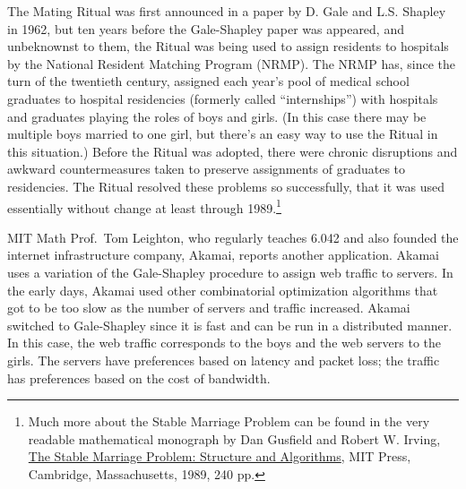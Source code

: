 The Mating Ritual was first announced in a paper by D. Gale and
L.S. Shapley in 1962, but ten years before the Gale-Shapley paper was
appeared, and unbeknownst to them, the Ritual was being used to assign
residents to hospitals by the National Resident Matching Program (NRMP).
The NRMP has, since the turn of the twentieth century, assigned each
year's pool of medical school graduates to hospital residencies (formerly
called ``internships'') with hospitals and graduates playing the roles of
boys and girls.  (In this case there may be multiple boys married to one
girl, but there's an easy way to use the Ritual in this situation.)
Before the Ritual was adopted, there were chronic disruptions and awkward
countermeasures taken to preserve assignments of graduates to residencies.
The Ritual resolved these problems so successfully, that it was used
essentially without change at least through 1989.\footnote{Much more about
the Stable Marriage Problem can be found in the very readable mathematical
monograph by Dan Gusfield and Robert W. Irving,
\href{http://mitpress.mit.edu/catalog/item/default.asp?ttype=2&tid=7676}{The
Stable Marriage Problem: Structure and Algorithms}, MIT Press, Cambridge,
Massachusetts, 1989, 240 pp.}

MIT Math Prof.\ Tom Leighton, who regularly teaches 6.042 and also founded
the internet infrastructure company, Akamai, reports another application.
Akamai uses a variation of the Gale-Shapley procedure to assign web
traffic to servers.  In the early days, Akamai used other combinatorial
optimization algorithms that got to be too slow as the number of servers
and traffic increased.  Akamai switched to Gale-Shapley since it is fast
and can be run in a distributed manner.  In this case, the web traffic
corresponds to the boys and the web servers to the girls.  The servers
have preferences based on latency and packet loss; the traffic has
preferences based on the cost of bandwidth.

\endinput
